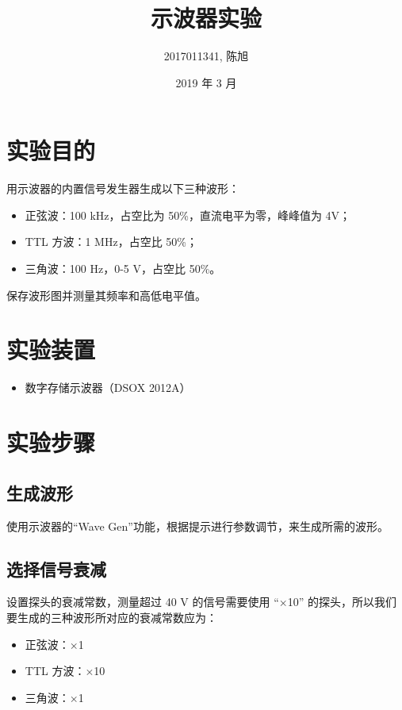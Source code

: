 \documentclass[a4paper]{article}
\title{示波器实验}
\author{2017011341, 陈旭}
\date{2019 年 3 月}
\begin{document}
\maketitle

\section{实验目的}

	\par 用示波器的内置信号发生器生成以下三种波形：

	\begin{itemize}
		\item 正弦波：100 kHz，占空比为 50\%，直流电平为零，峰峰值为 4V；
		\item TTL 方波：1 MHz，占空比 50\%；
		\item 三角波：100 Hz，0-5 V，占空比 50\%。
	\end{itemize}

	\par 保存波形图并测量其频率和高低电平值。

\section{实验装置}

	\begin{itemize}
		\item 数字存储示波器（DSOX 2012A）
	\end{itemize}

\section{实验步骤}

	\subsection{生成波形}

		\par 使用示波器的“Wave Gen”功能，根据提示进行参数调节，来生成所需的波形。

	\subsection{选择信号衰减}

		\par 设置探头的衰减常数，测量超过 40 V 的信号需要使用 “$\times$10” 的探头，所以我们要生成的三种波形所对应的衰减常数应为：

		\begin{itemize}
			\item 正弦波：$\times$1
			\item TTL 方波：$\times$10
			\item 三角波：$\times$1
		\end{itemize}
\end{document}
